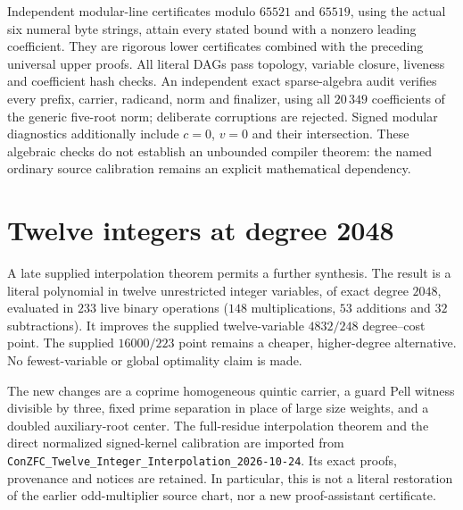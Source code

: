 \documentclass[11pt]{article}
\begin{document}
Independent modular-line certificates modulo $65521$ and $65519$, using
the actual six numeral byte strings, attain every stated bound with a
nonzero leading coefficient. They are rigorous lower certificates
combined with the preceding universal upper proofs.
All literal DAGs pass topology, variable closure, liveness and coefficient
hash checks. An independent exact sparse-algebra audit verifies every
prefix, carrier, radicand, norm and finalizer, using all $20\,349$
coefficients of the generic five-root norm; deliberate corruptions are
rejected. Signed modular diagnostics additionally include $c=0$, $v=0$
and their intersection. These algebraic checks do not establish an
unbounded compiler theorem: the named ordinary source calibration remains
an explicit mathematical dependency.

\section{Twelve integers at degree 2048}
\label{sec:twelve2048}
A late supplied interpolation theorem permits a further synthesis. The
result is a literal polynomial in twelve unrestricted integer variables,
of exact degree $2048$, evaluated in $233$ live binary operations
($148$ multiplications, $53$ additions and $32$ subtractions).
It improves the supplied twelve-variable $4832/248$ degree--cost point.
The supplied $16000/223$ point remains a cheaper, higher-degree alternative.
No fewest-variable or global optimality claim is made.

The new changes are a coprime homogeneous quintic carrier, a guard Pell
witness divisible by three, fixed prime separation in place of large
size weights, and a doubled auxiliary-root center. The full-residue
interpolation theorem and the direct normalized signed-kernel calibration
are imported from \texttt{ConZFC\_Twelve\_Integer\_Interpolation\_2026-10-24}.
Its exact proofs, provenance and notices are retained. In particular,
this is not a literal restoration of the earlier odd-multiplier source
chart, nor a new proof-assistant certificate.
\end{document}
